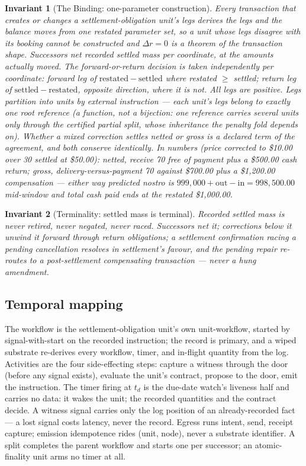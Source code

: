 \documentclass[11pt]{article}
\newtheorem{invariant}{Invariant}
\begin{document}
\begin{invariant}[The Binding: one-parameter construction]\label{inv:binding}
Every transaction that creates or changes a settlement-obligation unit's legs
derives the legs and the balance moves from one restated parameter set, so a unit
whose legs disagree with its booking cannot be constructed and
$\Delta r = 0$ is a theorem of the transaction shape. Successors net recorded
settled mass per coordinate, at the amounts actually moved. The forward-or-return
decision is taken independently per coordinate: forward leg of
$\mathrm{restated}-\mathrm{settled}$ where restated $\geq$ settled; return leg of
$\mathrm{settled}-\mathrm{restated}$, opposite direction, where it is not. All legs
are positive. Legs partition into units by external instruction --- each unit's
legs belong to exactly one root reference (a function, not a bijection: one
reference carries several units only through the certified partial split, whose
inheritance the penalty fold depends on). Whether a mixed correction settles
netted or gross is a declared term of the agreement, and both conserve
identically. In numbers (price corrected to \$10.00 over 30 settled at \$50.00):
netted, receive 70 free of payment plus a \$500.00 cash return; gross,
delivery-versus-payment 70 against \$700.00 plus a \$1{,}200.00 compensation ---
either way predicted nostro is $999{,}000 + \mathrm{out} - \mathrm{in} =
998{,}500.00$ mid-window and total cash paid ends at the restated
\$1{,}000.00.
\end{invariant}

\begin{invariant}[Terminality: settled mass is terminal]\label{inv:terminality}
Recorded settled mass is never retired, never negated, never raced. Successors net
it; corrections below it unwind it forward through return obligations; a
settlement confirmation racing a pending cancellation resolves in settlement's
favour, and the pending repair re-routes to a post-settlement compensating
transaction --- never a hung amendment.
\end{invariant}

\subsection{Temporal mapping}

The workflow is the settlement-obligation unit's own unit-workflow, started by
signal-with-start on the recorded instruction; the record is primary, and a wiped
substrate re-derives every workflow, timer, and in-flight quantity from the log.
Activities are the four side-effecting steps: capture a witness through the door
(before any signal exists), evaluate the unit's contract, propose to the door,
emit the instruction. The timer firing at $t_d$ is the due-date watch's liveness
half and carries no data: it wakes the unit; the recorded quantities and the
contract decide. A witness signal carries only the log position of an
already-recorded fact --- a lost signal costs latency, never the record. Egress
runs intent, send, receipt capture; emission idempotence rides (unit, node), never
a substrate identifier. A split completes the parent workflow and starts one per
successor; an atomic-finality unit arms no timer at all.
\end{document}
